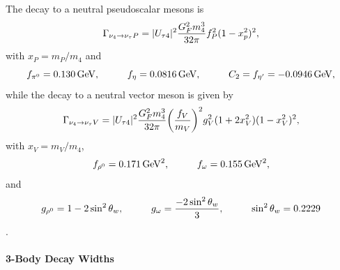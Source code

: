 The decay to a neutral pseudoscalar mesons is
\begin{equation}
    \Gamma_{\nu_4 \rightarrow \nu_\tau P} = |U_{\tau4}|^2 \frac{G_F^2 m_4^3}{32\pi} f_P^2 (1-x_p^2)^2,
    \labeq{gamma_nu_P}
\end{equation}
with $x_P = m_P/m_4$ and
\begin{equation}
    f_{\pi^0} = \SI{0.130}{\GeV}, \hspace{1cm} f_{\eta} = \SI{0.0816}{\GeV}, \hspace{1cm} C_2 = f_{\eta'} = \SI{-0.0946}{\GeV},
    \labeq{gamma_nu_P_f_factors}
\end{equation}
while the decay to a neutral vector meson is given by
\begin{equation}
    \Gamma_{\nu_4 \rightarrow \nu_\tau V} = |U_{\tau4}|^2 \frac{G_F^2 m_4^3}{32\pi} \bigg(\frac{f_V}{m_V}\bigg)^2 g_V^2 (1+2x_V^2) (1-x_V^2)^2,
    \labeq{gamma_nu_V}
\end{equation}
with $x_V = m_V/m_4$,
\begin{equation}
    f_{\rho^0} = \SI{0.171}{\square\GeV}, \hspace{1cm} f_{\omega} = \SI{0.155}{\square\GeV},
    \labeq{gamma_nu_V_f_factors}
\end{equation}
and
\begin{equation}
    g_{\rho^0} = 1-2\sin^2{\theta_w}, \hspace{1cm} g_{\omega} = \frac{-2\sin^2{\theta_w}}{3}, \hspace{1cm} \sin^2{\theta_w} = 0.2229
    \labeq{gamma_nu_V_g_factors}
\end{equation}
.


\paragraph{3-Body Decay Widths}

